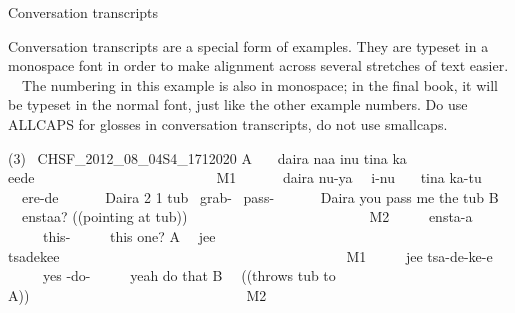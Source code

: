 \begin{styleHeadingii}
Conversation transcripts
\end{styleHeadingii}

\begin{styleTextbody}
Conversation transcripts are a special form of examples. They are typeset in a monospace font in order to make alignment across several stretches of text easier. \ \ The numbering in this example is also in monospace; in the final book, it will be typeset in the normal font, just like the other example numbers. Do use ALLCAPS for glosses in conversation transcripts, do not use smallcaps.
\end{styleTextbody}

\begin{styleConversationTranscript}
(3) \ CHSF\_2012\_08\_04S4\_1712020\newline
{} A \ \ \ daira naa inu tina ka{\textquotesingle} eede\ \  \ \ \ \ \ \ \ \ \ \ \ \ \ \ \ \ \ \ \ \ \ \ \ \ M1\newline
 \ \ \ \ \ \ daira nu-ya \ \ i-nu \ \ \ tina ka-tu \ \ ere-de\newline
 \ \ \ \ \ \ Daira 2  1  tub \ grab- \ pass-\newline
 \ \ \ \ \ \ Daira you pass me the tub\newline
{} B \ \ enstaa? ((pointing at tub))\ \  \ \ \ \ \ \ \ \ \ \ \ \ \ \ \ \ \ \ \ \ \ \ \ \ M2\newline
 \ \ \ \ \ ensta-a\newline
 \ \ \ \ \ this-\newline
 \ \ \ \ \ this one?\newline
{} A \ \ jee tsadekee\ \  \ \ \ \ \ \ \ \ \ \ \ \ \ \ \ \ \ \ \ \ \ \ \ \ \ \ \ \ \ \ \ \ \ \ \ \ \ \ \ M1\newline
 \ \ \ \ \ jee tsa-de-ke-e\newline
 \ \ \ \ \ yes -do-\newline
 \ \ \ \ \ yeah do that \newline
{} B \ \ ((throws tub to A))\ \  \ \ \ \ \ \ \ \ \ \ \ \ \ \ \ \ \ \ \ \ \ \ \ \ \ \ \ \ \ M2
\end{styleConversationTranscript}

